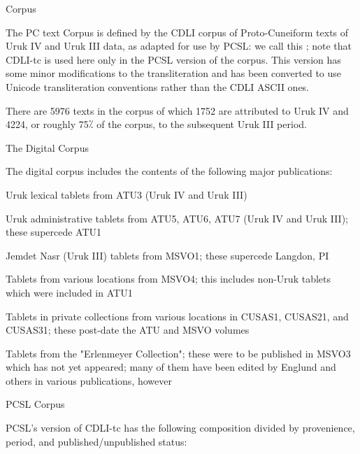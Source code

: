 \Henddl
\Hh{}Corpus


\par The PC text Corpus is defined by the CDLI corpus of
      Proto-Cuneiform texts of Uruk IV and Uruk III data, as adapted
      for use by PCSL: we call this ; note that
      CDLI-tc is used here only in the PCSL version of the
      corpus. This version has some minor modifications to the
      transliteration and has been converted to use Unicode
      transliteration conventions rather than the CDLI ASCII ones.


\par There are 5976 texts in the corpus of which 1752 are
      attributed to Uruk IV and 4224, or roughly 75⁒ of the corpus, to
      the subsequent Uruk III period.

\Hhhh{}The Digital Corpus


\par The digital corpus includes the contents of the following major publications:

\Hul\Hli{}Uruk lexical tablets from ATU3 (Uruk IV and Uruk III)

\Hli{}Uruk administrative tablets from ATU5, ATU6, ATU7 (Uruk IV and Uruk III);
	these supercede ATU1

\Hli{}Jemdet Nasr (Uruk III) tablets from MSVO1; these supercede
	Langdon, PI

\Hli{}Tablets from various locations from MSVO4; this includes
	non-Uruk tablets which were included in ATU1

\Hli{}Tablets in private collections from various locations in
	CUSAS1, CUSAS21, and CUSAS31; these post-date the ATU and MSVO
	volumes

\Hli{}Tablets from the "Erlenmeyer Collection"; these were to be
	published in MSVO3 which has not yet appeared; many of them
	have been edited by Englund and others in various
	publications, however

\Hendul
\Hhhh{}PCSL Corpus


\par PCSL's version of CDLI-tc has the following composition
      divided by provenience, period, and published/unpublished
      status:

\bigskip

